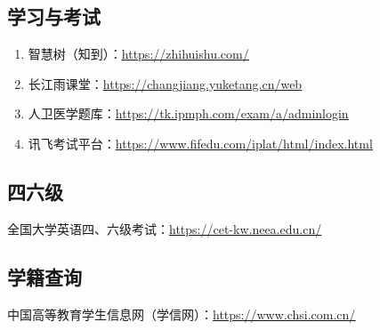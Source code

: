 \subsection[学习与考试]{学习与考试}
\begin{enumerate}
    \item 智慧树（知到）：\uline{\href{https://zhihuishu.com/}{https://zhihuishu.com/}}
    \item 长江雨课堂：\uline{\href{https://changjiang.yuketang.cn/web}{https://changjiang.yuketang.cn/web}}
    \item 人卫医学题库：\uline{\href{https://tk.ipmph.com/exam/a/adminlogin}{https://tk.ipmph.com/exam/a/adminlogin}}
    \item 讯飞考试平台：\uline{\href{https://www.fifedu.com/iplat/html/index.html}{https://www.fifedu.com/iplat/html/index.html}}
\end{enumerate}

\subsection[四六级]{四六级}
全国大学英语四、六级考试：\uline{\href{https://cet-kw.neea.edu.cn/}{https://cet-kw.neea.edu.cn/}}

\subsection[学籍查询]{学籍查询}
\label{student_status_query}
中国高等教育学生信息网（学信网）：\uline{\href{https://www.chsi.com.cn/}{https://www.chsi.com.cn/}}

\newpage
